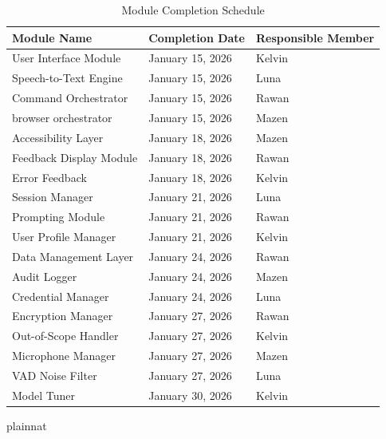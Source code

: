 \documentclass[12pt, titlepage]{article}
\begin{document}
\begin{table}[h!]
\centering
\begin{tabular}{|l|l|l|}
\hline
\textbf{Module Name} & \textbf{Completion Date} & \textbf{Responsible Member} \\ \hline
User Interface Module & January 15, 2026 & Kelvin \\
Speech-to-Text Engine & January 15, 2026 & Luna \\
Command Orchestrator & January 15, 2026 & Rawan \\
browser orchestrator & January 15, 2026 & Mazen \\ 
Accessibility Layer & January 18, 2026 & Mazen \\
Feedback Display Module & January 18, 2026 & Rawan \\
Error Feedback & January 18, 2026 & Kelvin \\ 
Session Manager & January 21, 2026 & Luna \\
Prompting Module & January 21, 2026 & Rawan \\
User Profile Manager & January 21, 2026 & Kelvin \\ 
Data Management Layer & January 24, 2026 & Rawan \\
Audit Logger & January 24, 2026 & Mazen \\
Credential Manager & January 24, 2026 & Luna \\ 
Encryption Manager & January 27, 2026 & Rawan \\
Out-of-Scope Handler & January 27, 2026 & Kelvin \\
Microphone Manager & January 27, 2026 & Mazen \\
VAD Noise Filter & January 27, 2026 & Luna \\ 
Model Tuner & January 30, 2026 & Kelvin \\ \hline
\end{tabular}
\caption{Module Completion Schedule}
\label{tab:module_completion_schedule}
\end{table}


\noindent
\medskip
\noindent


 {plainnat}


\newpage{}
\end{document}
